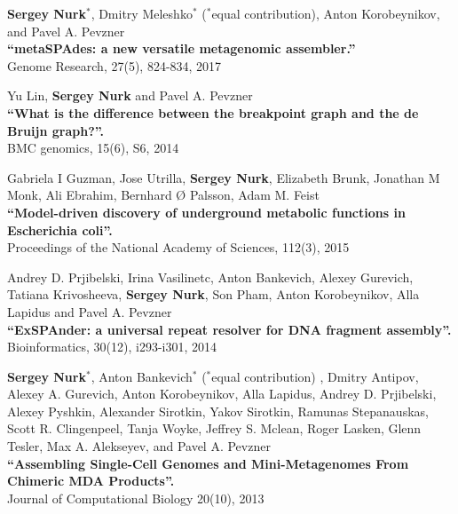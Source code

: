 \begin{outerlist}
\item
\textbf{Sergey Nurk}$^*$, Dmitry Meleshko$^*$ ($^*$equal contribution), Anton Korobeynikov, and Pavel A. Pevzner \\
\textbf{``metaSPAdes: a new versatile metagenomic assembler.''} \\
Genome Research, 27(5), 824-834, 2017

\item
Yu Lin, \textbf{Sergey Nurk} and Pavel A. Pevzner\\
\textbf{``What is the difference between the breakpoint graph and the de Bruijn graph?''.} \\
BMC genomics, 15(6), S6, 2014

\item Gabriela I Guzman, Jose Utrilla, \textbf{Sergey Nurk}, Elizabeth Brunk, Jonathan M Monk, Ali Ebrahim, Bernhard Ø Palsson, Adam M. Feist\\
\textbf{``Model-driven discovery of underground metabolic functions in Escherichia coli''.} \\
Proceedings of the National Academy of Sciences, 112(3), 2015

\item Andrey D. Prjibelski, Irina Vasilinetc, Anton Bankevich, Alexey Gurevich, Tatiana Krivosheeva, \textbf{Sergey Nurk}, Son Pham, Anton Korobeynikov, Alla Lapidus and Pavel A. Pevzner\\
\textbf{``ExSPAnder: a universal repeat resolver for DNA fragment assembly''.} \\
Bioinformatics, 30(12), i293-i301, 2014

\item \textbf{Sergey Nurk}$^*$, Anton Bankevich$^*$ ($^*$equal contribution)%
, Dmitry Antipov, Alexey A. Gurevich, Anton Korobeynikov, Alla Lapidus, Andrey D. Prjibelski, Alexey Pyshkin, Alexander Sirotkin, Yakov Sirotkin, Ramunas Stepanauskas, Scott R. Clingenpeel, Tanja Woyke, Jeffrey S. Mclean, Roger Lasken, Glenn Tesler, Max A. Alekseyev, and Pavel A. Pevzner \\
\textbf{``Assembling Single-Cell Genomes and Mini-Metagenomes From Chimeric MDA Products''.} \\
Journal of Computational Biology 20(10), 2013



\end{outerlist}
